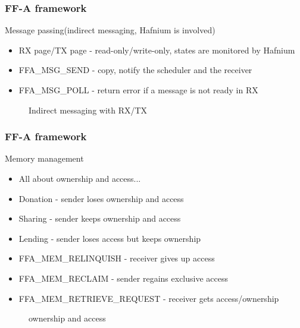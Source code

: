 \documentclass{beamer}
\begin{document}
\begin{frame}
  \frametitle{FF-A framework}
  Message passing(indirect messaging, Hafnium is involved)
  \begin{itemize}
    \item RX page/TX page - read-only/write-only, states are monitored by Hafnium
    \item FFA\_MSG\_SEND - copy, notify the scheduler and the receiver
    \item FFA\_MSG\_POLL - return error if a message is not ready in RX
  \end{itemize}
  \begin{figure}
    
        \caption{Indirect messaging with RX/TX}
      \end{figure}
\end{frame}

\begin{frame}
  \frametitle{FF-A framework}
  Memory management
  \begin{itemize}
    \item All about ownership and access...
    \item Donation - sender loses ownership and access
    \item Sharing - sender keeps ownership and access
    \item Lending - sender loses access but keeps ownership
    \item FFA\_MEM\_RELINQUISH - receiver gives up access
    \item FFA\_MEM\_RECLAIM - sender regains exclusive access
    \item FFA\_MEM\_RETRIEVE\_REQUEST - receiver gets access/ownership
  \end{itemize}
  \begin{figure}
    
        \caption{ownership and access}
      \end{figure}
    \end{frame}
\end{document}

